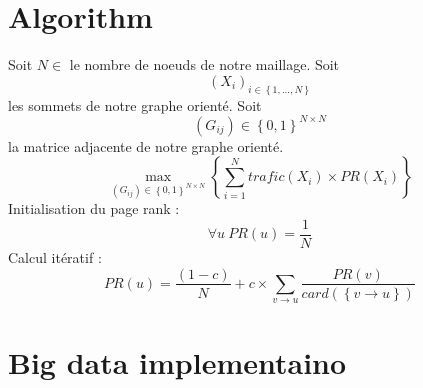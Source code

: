 \documentclass{iSWAGArticle}
\begin{document}
\section{Algorithm}
Soit $N \in $ le nombre de noeuds de notre maillage.
Soit $$\left(X_i\right)_{i \in \left\{1,...,N\right\}}$$ les sommets de notre graphe orienté.
Soit $$\left(G_{ij}\right)  \in \left\{0,1\right\}^{N\times N}$$ la matrice adjacente de notre graphe orienté.
\begin{equation}
\max_{\left(G_{ij}\right)  \in \left\{0,1\right\}^{N\times N}}\left\{ \sum^{N}_{i=1} trafic\left(X_i\right)\times PR(X_i)\right\}
\end{equation} 
Initialisation du page rank :
\begin{equation}
\forall u \ PR\left(u\right)=\frac{1}{N}
\end{equation} 
Calcul itératif :
\begin{equation}
PR\left(u\right)= \frac{\left(1-c\right)}{N} + c \times \sum_{v \rightarrow u}\frac{PR\left(v\right)}{card\left(\left\{v\rightarrow u\right\}\right)}
\end{equation}
\section{Big data implementaino}



\end{document}
